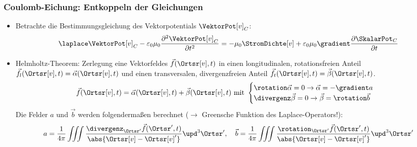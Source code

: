   \begin{frame}
  \frametitle{Coulomb-Eichung: Entkoppeln der Gleichungen}
  \begin{itemize}[<+->]
  \item Betrachte die Bestimmungsgleichung des Vektorpotentials $\VektorPot[v]_C$:
    \begin{equation*}
      \laplace\VektorPot[v]_C -\varepsilon_0 \mu_0\frac{\partial^2\VektorPot[v]_C}{\partial t^2} = -\mu_0\StromDichte[v] +\varepsilon_0\mu_0 \gradient\frac{\partial\SkalarPot_C}{\partial t}
      \end{equation*}
    \item \alert{Helmholtz-Theorem:} Zerlegung eine Vektorfeldes $\vec{f}(\Ortsr[v],t)$ in einen longitudinalen, rotationsfreien Anteil $\vec{f}_l(\Ortsr[v],t)=\vec{\alpha}(\Ortsr[v],t)$ und einen transversalen, divergenzfreien Anteil $\vec{f}_t(\Ortsr[v],t)=\vec{\beta}(\Ortsr[v],t)$.
      \begin{equation}
        \vec{f}(\Ortsr[v],t) = \vec{\alpha}(\Ortsr[v],t) + \vec{\beta}(\Ortsr[v],t) \text{ mit }  \begin{cases}\rotation\vec{\alpha} = 0 \to \vec{\alpha} = -\gradient a\\
                                                                                                          \divergenz\vec{\beta} = 0 \to \vec{\beta} = \rotation \vec{b}\end{cases} 
          \label{eq:helmholtz1}
         \end{equation}
        Die Felder $a$ und $\vec{b}$ werden folgendermaßen berechnet ($\to$ Greensche Funktion des Laplace-Operators!):
        \begin{equation}
          a = \frac{1}{4\pi} \iiint \frac{\divergenz_{\Ortsr^\prime}\vec{f}(\Ortsr^\prime, t)}{\abs{\Ortsr[v]-\Ortsr[v]^\prime}} \upd^3\Ortsr^\prime, \quad
          \vec{b} = \frac{1}{4\pi} \iiint \frac{\rotation_{\Ortsr^\prime}\vec{f}(\Ortsr^\prime, t)}{\abs{\Ortsr[v]-\Ortsr[v]^\prime}} \upd^3\Ortsr^\prime
          \label{eq:helmholtz2}
          \end{equation}
    \end{itemize}
  \end{frame}

